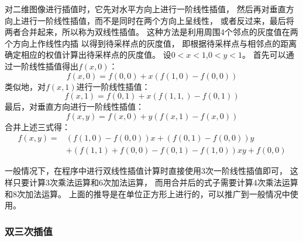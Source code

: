 对二维图像进行插值时，它先对水平方向上进行一阶线性插值，
然后再对垂直方向上进行一阶线性插值，而不是同时在两个方向上呈线性，
或者反过来，最后将两者合并起来，所以称为双线性插值。
这种方法是利用周围4个邻点的灰度值在两个方向上作线性内插
以得到待采样点的灰度值，
即根据待采样点与相邻点的距离确定相应的权值计算出待采样点的灰度值。
设$0<x<1$,$0<y<1$。
首先可以通过一阶线性插值得出$f(x,0)$：
\begin{equation}
  f(x,0)=f(0,0)+x(f(1,0)-f(0,0))
\end{equation}
类似地，对$f(x,1)$进行一阶线性插值：
\begin{equation}
  f(x,1)=f(0,1)+x(f(1,1,)-f(0,1))
\end{equation}
最后，对垂直方向进行一阶线性插值：
\begin{equation}
  f(x,y)=f(x,0)+y(f(x,1)-f(x,0))
\end{equation}
合并上述三式得：
\begin{equation}
  \begin{split}
    f(x,y)=&(f(1,0)-f(0,0))x+(f(0,1)-f(0,0))y\\
    &+(f(1,1)+f(0,0)-f(0,1)-f(1,0))xy+f(0,0)
  \end{split}
\end{equation}

一般情况下，在程序中进行双线性插值计算时直接使用3次一阶线性插值即可，
这样只要计算3次乘法运算和6次加法运算，
而用合并后的式子需要计算4次乘法运算和8次加法运算。
上面的推导是在单位正方形上进行的，可以推广到一般情况中使用。

\subsubsection{双三次插值}
